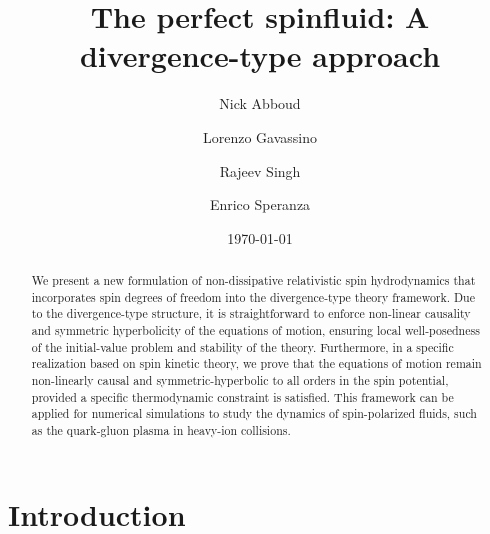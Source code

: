 \documentclass[12pt,aps,prd,nofootinbib,noshowkeys,noshowpacs,longbibliography,
superscriptaddress,tightenlines,floatfix,preprintnumbers]{revtex4-2}
\begin{document}


    \title{The perfect spinfluid: A divergence-type approach}
    \author{Nick Abboud}
    \author{Lorenzo Gavassino}
    \author{Rajeev Singh}
    \author{Enrico Speranza}
    
%
	\date{\today} 
	\bigskip


\begin{abstract}
We present a new formulation of non-dissipative relativistic spin hydrodynamics that incorporates spin degrees of freedom into the divergence-type theory framework. 
Due to the divergence-type structure, it is straightforward to enforce non-linear causality and symmetric hyperbolicity of the equations of motion, ensuring local well-posedness of the initial-value problem and stability of the theory.
Furthermore, in a specific realization based on spin kinetic theory, we prove that the equations of motion remain non-linearly causal and symmetric-hyperbolic to all orders in the spin potential, provided a specific thermodynamic constraint is satisfied.
This framework can be applied for numerical simulations to study the dynamics of spin-polarized fluids, such as the quark-gluon plasma in heavy-ion collisions.
\end{abstract}


\maketitle
\newpage
\tableofcontents
\section{Introduction}
\label{sec:introduction}
\end{document}
